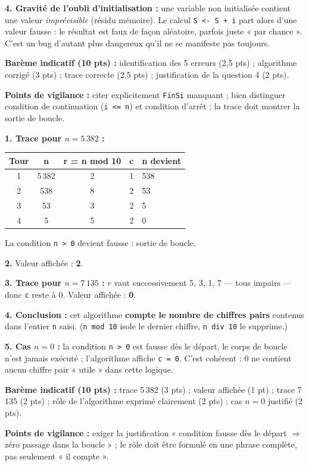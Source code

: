 \documentclass[11pt]{article}
\begin{document}
\begin{corrige}
\textbf{4. Gravité de l'oubli d'initialisation :} une variable non initialisée contient une valeur \emph{imprévisible} (résidu mémoire). Le calcul \texttt{S <- S + i} part alors d'une valeur fausse : le résultat est faux de façon aléatoire, parfois juste « par chance ». C'est un bug d'autant plus dangereux qu'il ne se manifeste pas toujours.

\textbf{Barème indicatif (10 pts) :} identification des 5 erreurs (2,5 pts) ; algorithme corrigé (3 pts) ; trace correcte (2,5 pts) ; justification de la question 4 (2 pts).

\textbf{Points de vigilance :} citer explicitement \texttt{FinSi} manquant ; bien distinguer condition de continuation (\texttt{i <= n}) et condition d'arrêt ; la trace doit montrer la sortie de boucle.
\end{corrige}

\begin{corrige}
\textbf{1. Trace pour $n = 5\,382$ :}
\begin{center}
\begin{tabularx}{0.85\linewidth}{|c|c|c|c|X|}
\hline
\rowcolor{popblueL} \textbf{Tour} & \textbf{n} & \textbf{r = n mod 10} & \textbf{c} & \textbf{n devient} \\
\hline
1 & 5\,382 & 2 & 1 & 538 \\
2 & 538 & 8 & 2 & 53 \\
3 & 53 & 3 & 2 & 5 \\
4 & 5 & 5 & 2 & 0 \\
\hline
\end{tabularx}
\end{center}
La condition \texttt{n > 0} devient fausse : sortie de boucle.

\textbf{2.} Valeur affichée : \textbf{2}.

\textbf{3. Trace pour $n = 7\,135$ :} $r$ vaut successivement 5, 3, 1, 7 — tous impairs — donc \texttt{c} reste à 0. Valeur affichée : \textbf{0}.

\textbf{4. Conclusion :} cet algorithme \textbf{compte le nombre de chiffres pairs} contenus dans l'entier \texttt{n} saisi. (\texttt{n mod 10} isole le dernier chiffre, \texttt{n div 10} le supprime.)

\textbf{5. Cas $n = 0$ :} la condition \texttt{n > 0} est fausse dès le départ, le corps de boucle n'est jamais exécuté ; l'algorithme affiche \texttt{c = 0}. C'est cohérent : 0 ne contient aucun chiffre pair « utile » dans cette logique.

\textbf{Barème indicatif (10 pts) :} trace 5\,382 (3 pts) ; valeur affichée (1 pt) ; trace 7\,135 (2 pts) ; rôle de l'algorithme exprimé clairement (2 pts) ; cas $n = 0$ justifié (2 pts).

\textbf{Points de vigilance :} exiger la justification « condition fausse dès le départ $\Rightarrow$ zéro passage dans la boucle » ; le rôle doit être formulé en une phrase complète, pas seulement « il compte ».
\end{corrige}
\end{document}
